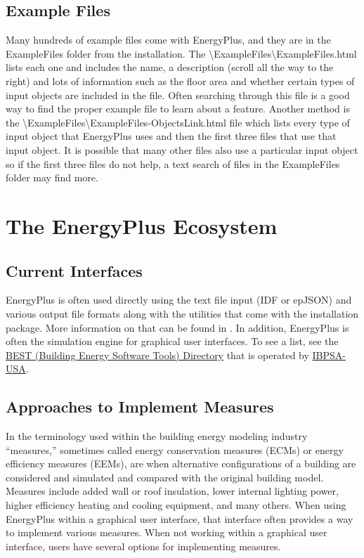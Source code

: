 \section{Example Files }

Many hundreds of example files come with EnergyPlus, and they are
in the ExampleFiles folder from the installation. The \textbackslash ExampleFiles\textbackslash ExampleFiles.html
lists each one and includes the name, a description (scroll all the
way to the right) and lots of information such as the floor area and
whether certain types of input objects are included in the file. Often
searching through this file is a good way to find the proper example
file to learn about a feature. Another method is the \textbackslash ExampleFiles\textbackslash ExampleFiles-ObjectsLink.html
file which lists every type of input object that EnergyPlus uses and
then the first three files that use that input object. It is possible
that many other files also use a particular input object so if the
first three files do not help, a text search of files in the ExampleFiles
folder may find more. 

\chapter{The EnergyPlus Ecosystem }

\section{Current Interfaces }

EnergyPlus is often used directly using the text file input (IDF or
epJSON) and various output file formats along with the utilities that
come with the installation package. More information on that can be
found in . In addition, EnergyPlus is often
the simulation engine for graphical user interfaces. To see a list,
see the \href{https://www.buildingenergysoftwaretools.com/}{BEST (Building Energy Software Tools) Directory}
that is operated by \href{https://www.ibpsa.us/}{IBPSA-USA}. 

\section{Approaches to Implement Measures }

In the terminology used within the building energy modeling industry
``measures,'' sometimes called energy conservation measures (ECMs)
or energy efficiency measures (EEMs), are when alternative configurations
of a building are considered and simulated and compared with the original
building model. Measures include added wall or roof insulation, lower
internal lighting power, higher efficiency heating and cooling equipment,
and many others. When using EnergyPlus within a graphical user interface,
that interface often provides a way to implement various measures.
When not working within a graphical user interface, users have several
options for implementing measures.

